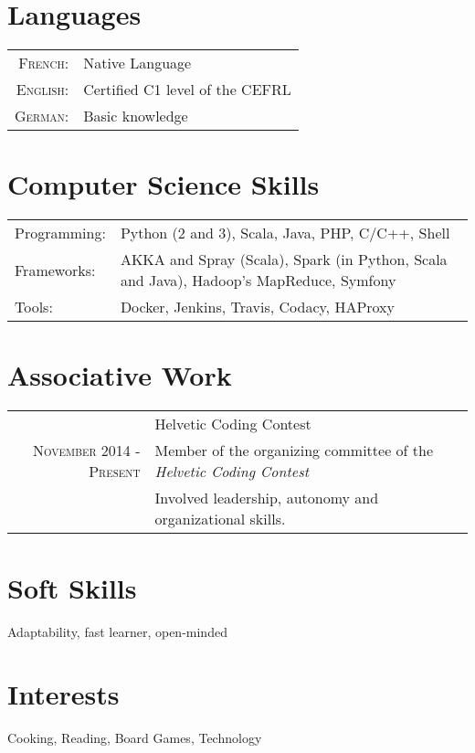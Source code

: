 \documentclass[a4paper,10pt]{article}
\begin{document}
\section{Languages}
\begin{tabular}{rl}
	\textsc{French:}&Native Language\\
	\textsc{English:}&Certified C1 level of the CEFRL\\
	\textsc{German:}&Basic knowledge
\end{tabular}

\section{Computer Science Skills}
\begin{tabular}{ll}
	Programming:& Python (2 and 3), Scala, Java, PHP, C/C++, Shell\\
	Frameworks:& AKKA and Spray (Scala), Spark (in Python, Scala and Java), Hadoop’s MapReduce, Symfony\\
	Tools:& Docker, Jenkins, Travis, Codacy, HAProxy
\end{tabular}

\section{Associative Work}
\begin{tabular}{r|p{11cm}}
	&Helvetic Coding Contest\\
	\textsc{November 2014 - Present}&Member of the organizing committee of the \emph{Helvetic Coding Contest}\\
	&Involved leadership, autonomy and organizational skills.
\end{tabular}

\section{Soft Skills}
Adaptability, fast learner, open-minded

\section{Interests}
Cooking, Reading, Board Games, Technology
\end{document}
